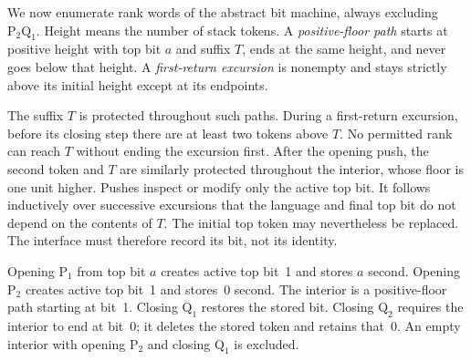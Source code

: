 \documentclass[11pt,a4paper]{article}
\theoremstyle{remark}
\newcommand{\PP}{\mathrm{P}}
\newcommand{\QQ}{\mathrm{Q}}
\begin{document}
We now enumerate rank words of the abstract bit machine, always excluding
$\PP_2\QQ_1$. Height means the number of stack tokens. A
\emph{positive-floor path} starts at positive height with top bit $a$ and
suffix $T$, ends at the same height, and never goes below that height.
A \emph{first-return excursion} is nonempty and stays strictly above
its initial height except at its endpoints.

The suffix $T$ is protected throughout such paths. During a first-return
excursion, before its closing step there are at least two tokens above
$T$. No permitted rank can reach $T$ without ending the excursion first.
After the opening push, the second token and $T$ are similarly protected
throughout the interior, whose floor is one unit higher. Pushes inspect
or modify only the active top bit. It follows inductively over successive
excursions that the language and final top bit do not depend on the
contents of $T$. The initial top token may nevertheless be replaced.
The interface must therefore record its bit, not its identity.

Opening $\PP_1$ from top bit $a$ creates active top bit~1 and stores $a$
second. Opening $\PP_2$ creates active top bit~1 and stores~0 second.
The interior is a positive-floor path starting at bit~1. Closing $\QQ_1$
restores the stored bit. Closing $\QQ_2$ requires the interior to end at
bit~0; it deletes the stored token and retains that~0. An empty interior
with opening $\PP_2$ and closing $\QQ_1$ is excluded.
\end{document}
